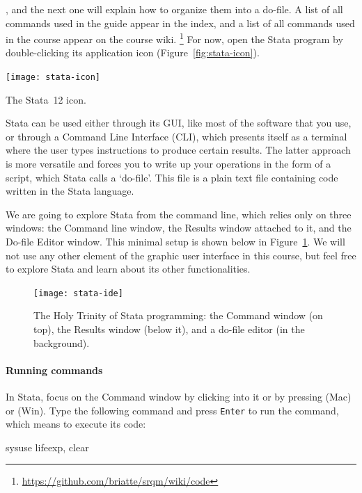 , and the next one will explain how to organize them into a do-file. A list of all commands used in the guide appear in the index, and a list of all commands used in the course appear on the course wiki.%
  \footnote{\url{https://github.com/briatte/srqm/wiki/code}} %
For now, open the Stata program by double-clicking its application icon (Figure~\ref{fig:stata-icon}).

  \begin{marginfigure}
    \texttt{[image: stata-icon]}
    \caption{The Stata~12 icon.}
    \label{fig:stata-icon}
  \end{marginfigure}

Stata can be used either through its GUI, like most of the software that you use, or through a Command Line Interface (CLI), which presents itself as a terminal where the user types instructions to produce certain results. The latter approach is more versatile and forces you to write up your operations in the form of a script, which Stata calls a `do-file'. This file is a plain text file containing code written in the Stata language.%

We are going to explore Stata from the command line, which relies only on three windows: the Command line window, the Results window attached to it, and the Do-file Editor window. This minimal setup is shown below in Figure~\ref{fig:stata-ide}. We will not use any other element of the graphic user interface in this course, but feel free to explore Stata and learn about its other functionalities.%

\begin{figure}
  \texttt{[image: stata-ide]}%
  \caption{The Holy Trinity of Stata programming: the Command window (on top), the Results window (below it), and a do-file editor (in the background).}%
  \label{fig:stata-ide}%
\end{figure}

  \paragraph{Running commands}
  
  In Stata, focus on the Command window by clicking into it or by pressing  (Mac) or (Win). Type the following command and press \texttt{Enter} to run the command, which means to execute its code:%
    
  \begin{docspec}%
    \label{lifeexp}%
    sysuse lifeexp, clear
  \end{docspec}
    
